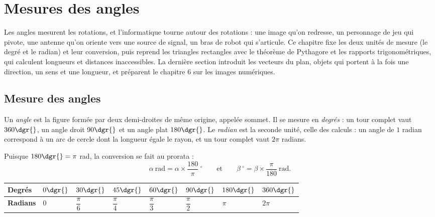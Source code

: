\chapter{Mesures des angles}

\begin{quelqueslignes}
Les angles mesurent les rotations, et l'informatique tourne autour des rotations : une image qu'on redresse, un personnage de jeu qui pivote, une antenne qu'on oriente vers une source de signal, un bras de robot qui s'articule. Ce chapitre fixe les deux unités de mesure (le degré et le radian) et leur conversion, puis reprend les triangles rectangles avec le théorème de Pythagore et les rapports trigonométriques, qui calculent longueurs et distances inaccessibles. La dernière section introduit les vecteurs du plan, objets qui portent à la fois une direction, un sens et une longueur, et préparent le chapitre 6 sur les images numériques.
\end{quelqueslignes}

\section{Mesure des angles}

\begin{definition}
Un \emph{angle} est la figure formée par deux demi-droites de même origine, appelée sommet. Il se mesure en \emph{degrés} : un tour complet vaut $360\dgr{}$, un angle droit $90\dgr{}$ et un angle plat $180\dgr{}$. Le \emph{radian} est la seconde unité, celle des calculs : un angle de $1$ radian correspond à un arc de cercle dont la longueur égale le rayon, et un tour complet vaut $2\pi$ radians.
\end{definition}

\begin{propriete}
Puisque $180\dgr{} = \pi$ rad, la conversion se fait au prorata :
\[
\alpha\ \text{rad} = \alpha \times \frac{180}{\pi}\ {}^\circ
\qquad\text{et}\qquad
\beta\ {}^\circ = \beta \times \frac{\pi}{180}\ \text{rad} .
\]
\end{propriete}

\begin{center}
\small
\begin{tabular}{C{1.5cm}C{1.5cm}C{1.5cm}C{1.5cm}C{1.5cm}C{1.5cm}C{1.5cm}C{1.5cm}}
\toprule
{}\textbf{Degrés} & $0\dgr{}$ & $30\dgr{}$ & $45\dgr{}$ & $60\dgr{}$ & $90\dgr{}$ & $180\dgr{}$ & $360\dgr{}$\\
\midrule
\textbf{Radians} & $0$ & $\dfrac{\pi}{6}$ & $\dfrac{\pi}{4}$ & $\dfrac{\pi}{3}$ & $\dfrac{\pi}{2}$ & $\pi$ & $2\pi$\\
\bottomrule
\end{tabular}
\label{ch5:tab:angles}
\end{center}

